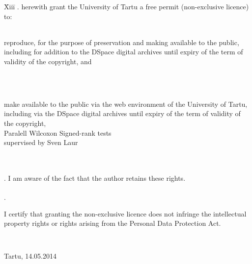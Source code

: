 \documentclass[12pt]{article}
\begin{document}
\begin{tabbing}
\= Xiii\=\kill
{}. \> herewith grant the University of Tartu a free permit (non-exclusive licence) to:\\\\

\>
\begin{minipage}[t]{14.2cm}
reproduce, for the purpose of preservation and making available to the public, including for addition to the DSpace digital archives until expiry of the term of validity of the copyright, and
\end{minipage}
\\\\
\begin{minipage}[t]{14.2cm}
make available to the public via the web environment of the University of Tartu, including via the DSpace digital archives until expiry of the term of validity of the copyright,\\

Paralell Wilcoxon Signed-rank tests\\

supervised by Sven Laur

\end{minipage}\\\\
. \>I am aware of the fact that the author retains these rights.\\\\
. \>
\begin{minipage}[t]{14.2cm}
I certify that granting the non-exclusive licence does not infringe the intellectual property rights or rights arising from the Personal Data Protection Act.
\end{minipage}\\
\end{tabbing}

\noindent
Tartu, 14.05.2014
\end{document}
